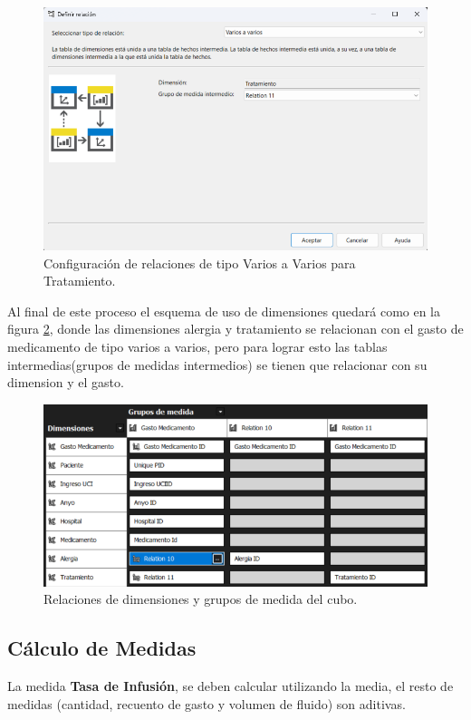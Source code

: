 \documentclass{article}
\begin{document}
\begin{figure}[H]
	\begin{center} 
		\includegraphics[width=.7\textwidth]{images/relation11.png}
		\caption{Configuración de relaciones de tipo Varios a Varios para Tratamiento.}
		\label{fig:relation11}
	\end{center}
\end{figure}

Al final de este proceso el esquema de uso de dimensiones quedará como en la figura \ref{fig:uso_dim}, donde las dimensiones alergia y tratamiento se relacionan con el gasto de medicamento de tipo varios a varios, pero para lograr esto las tablas intermedias(grupos de medidas intermedios) se tienen que relacionar con su dimension y el gasto.

\begin{figure}[H]
	\begin{center} 
		\includegraphics[width=.7\textwidth]{images/usoDimensiones.png} 
		\caption{Relaciones de dimensiones y grupos de medida del cubo.}
		\label{fig:uso_dim}
	\end{center}
\end{figure}
\subsection{Cálculo de Medidas}
La medida \textbf{Tasa de Infusión}, se deben calcular utilizando la media, el resto de medidas (cantidad, recuento de gasto y volumen de fluido) son aditivas.
\end{document}
